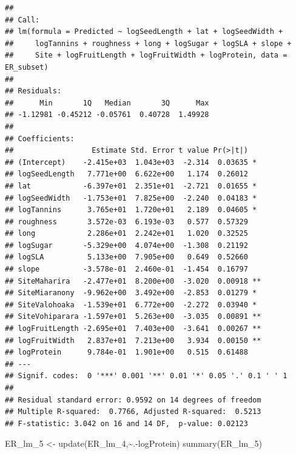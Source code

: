 \documentclass[
  12pt,
]{article}
\newenvironment{Shaded}{\begin{snugshade}}{\end{snugshade}}
\newcommand{\FunctionTok}[1]{\textcolor[rgb]{0.00,0.00,0.00}{#1}}
\newcommand{\NormalTok}[1]{#1}
\newcommand{\OtherTok}[1]{\textcolor[rgb]{0.56,0.35,0.01}{#1}}
\newcommand{\SpecialCharTok}[1]{\textcolor[rgb]{0.00,0.00,0.00}{#1}}
\begin{document}
\begin{verbatim}
## 
## Call:
## lm(formula = Predicted ~ logSeedLength + lat + logSeedWidth + 
##     logTannins + roughness + long + logSugar + logSLA + slope + 
##     Site + logFruitLength + logFruitWidth + logProtein, data = ER_subset)
## 
## Residuals:
##      Min       1Q   Median       3Q      Max 
## -1.12981 -0.45212 -0.05761  0.40728  1.49928 
## 
## Coefficients:
##                  Estimate Std. Error t value Pr(>|t|)   
## (Intercept)    -2.415e+03  1.043e+03  -2.314  0.03635 * 
## logSeedLength   7.771e+00  6.622e+00   1.174  0.26012   
## lat            -6.397e+01  2.351e+01  -2.721  0.01655 * 
## logSeedWidth   -1.753e+01  7.825e+00  -2.240  0.04183 * 
## logTannins      3.765e+01  1.720e+01   2.189  0.04605 * 
## roughness       3.572e-03  6.193e-03   0.577  0.57329   
## long            2.286e+01  2.242e+01   1.020  0.32525   
## logSugar       -5.329e+00  4.074e+00  -1.308  0.21192   
## logSLA          5.133e+00  7.905e+00   0.649  0.52660   
## slope          -3.578e-01  2.460e-01  -1.454  0.16797   
## SiteMaharira   -2.477e+01  8.200e+00  -3.020  0.00918 **
## SiteMiaranony  -9.962e+00  3.492e+00  -2.853  0.01279 * 
## SiteValohoaka  -1.539e+01  6.772e+00  -2.272  0.03940 * 
## SiteVohiparara -1.597e+01  5.263e+00  -3.035  0.00891 **
## logFruitLength -2.695e+01  7.403e+00  -3.641  0.00267 **
## logFruitWidth   2.837e+01  7.213e+00   3.934  0.00150 **
## logProtein      9.784e-01  1.901e+00   0.515  0.61488   
## ---
## Signif. codes:  0 '***' 0.001 '**' 0.01 '*' 0.05 '.' 0.1 ' ' 1
## 
## Residual standard error: 0.9592 on 14 degrees of freedom
## Multiple R-squared:  0.7766, Adjusted R-squared:  0.5213 
## F-statistic: 3.042 on 16 and 14 DF,  p-value: 0.02123
\end{verbatim}

\begin{Shaded}
\begin{Highlighting}[]
\NormalTok{ER\_lm\_5 }\OtherTok{\textless{}{-}} \FunctionTok{update}\NormalTok{(ER\_lm\_4,}\SpecialCharTok{\textasciitilde{}}\NormalTok{.}\SpecialCharTok{{-}}\NormalTok{logProtein)}
\FunctionTok{summary}\NormalTok{(ER\_lm\_5)}
\end{Highlighting}
\end{Shaded}
\end{document}
